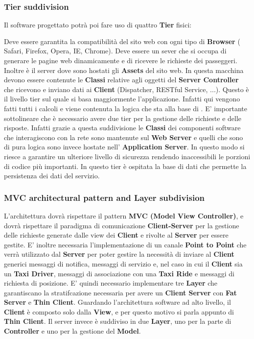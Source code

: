 \subsubsection{Tier suddivision}
Il software progettato potrà poi fare uso di quattro \textbf{Tier} fisici:
\begin{itemize}
	 Deve essere garantita la compatibilità del sito web con ogni tipo di \textbf{Browser} ( Safari, Firefox, Opera, IE, Chrome).
	 Deve essere un sever che si occupa di generare le pagine web dinamicamente e di ricevere le richieste dei passeggeri. Inoltre è il server dove sono hostati gli \textbf{Assets} del sito web. In questa macchina devono essere contenute le \textbf{Classi} relative agli oggetti del \textbf{Server Controller} che ricevono e inviano dati ai \textbf{Client} (Dispatcher, RESTful Service, ...).
	 Questo è il livello tier sul quale si basa maggiormente l'applicazione. 
	Infatti qui vengono fatti tutti i calcoli e viene contenuta la logica che sta alla base di \myTaxiService{}. 
	E' importante sottolineare che è necessario avere due tier per la gestione delle richieste e delle risposte. Infatti grazie a questa suddivisione le \textbf{Classi} dei componenti software che interagiscono con la rete sono mantenute sul \textbf{Web Server} e quelli che sono di pura logica sono invece hostate nell' \textbf{Application Server}.
	In questo modo si riesce a garantire un ulteriore livello di sicurezza rendendo inaccessibili le porzioni di codice più importanti.
	 In questo tier è ospitata la base di dati che permette la persistenza dei dati del servizio.
\end{itemize}
\subsubsection{MVC architectural pattern and Layer subdivision}
L'architettura dovrà rispettare il pattern \textbf{MVC (Model View Controller)}, e dovrà rispettare il paradigma di comunicazione \textbf{Client-Server} per la gestione delle richieste generate dalle view dei \textbf{Client} e rivolte al \textbf{Server} per essere gestite. 
E' inoltre necessaria l'implementazione di un canale \textbf{Point to Point} che verrà utilizzato dal \textbf{Server} per poter gestire la necessità di inviare al \textbf{Client} generici messaggi di notifica, messaggi di servizio e, nel caso in cui il \textbf{Client} sia un \textbf{Taxi Driver}, messaggi di associazione con una \textbf{Taxi Ride} e messaggi di richiesta di posizione.
E' quindi necessario implementare tre \textbf{Layer} che garantiscano la stratifcazione necessaria per avere un \textbf{Client Server} con \textbf{Fat Server} e \textbf{Thin Client}.
Guardando l'architettura software ad alto livello, il \textbf{Client} è composto solo dalla \textbf{View}, e per questo motivo si parla appunto di \textbf{Thin Client}. 
Il server invece è suddiviso in due \textbf{Layer}, uno per la parte di \textbf{Controller} e uno per la gestione del \textbf{Model}.
